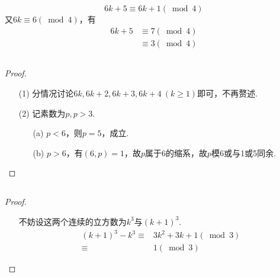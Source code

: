 \documentclass[UTF8]{ctexart}
\begin{document}
\subsection{}   %
\[
    6k+5 \equiv 6k+1 (\bmod 4) 
\]
又$6k \equiv 6 (\bmod 4)$，有
\[
    \begin{aligned}
        6k+5 
        &\equiv 7 (\bmod 4)\\
        &\equiv 3 (\bmod 4)
    \end{aligned}
\]

\subsection{}   %
\begin{proof}
    \begin{enumerate}
        \item []
        \item [(1)]分情况讨论$6k,6k+2,6k+3,6k+4\ (k\geq 1)$即可，不再赘述.
        \item [(2)]记素数为$p,p>3$.
        \begin{enumerate}
            \item [(a)]$p<6$，则$p=5$，成立.
            \item [(b)]$p>6$，有$(6,p)=1$，故$p$属于6的缩系，故$p$模$6$或与1或5同余.
        \end{enumerate}
    \end{enumerate}
\end{proof}

\subsection{}   %
\begin{proof}
    \begin{enumerate}
        \item []
        \item []不妨设这两个连续的立方数为$k^3$与${(k+1)}^3$.
        \[
            \begin{aligned}
                {(k+1)}^3 - k^3 
                \equiv & 3k^2 + 3k + 1 (\bmod 3) \\
                \equiv & 1 (\bmod 3)
            \end{aligned}
        \]
    \end{enumerate}
\end{proof}
\end{document}
